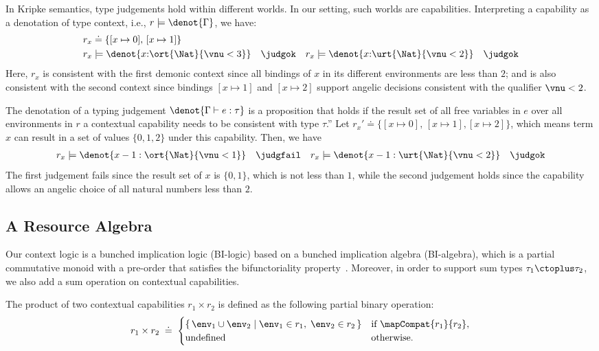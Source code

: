 \begin{example}\label{ex-algebraic-semantics} In Kripke semantics, type judgements hold within different
worlds.  In our setting, such worlds are capabilities.  Interpreting
a capability as a denotation of type context, i.e., $r \models
\denot{\Gamma}$, we have:
\begin{align*}
  &r_x \doteq \{[x \mapsto 0],\, [x \mapsto 1]\}
  \\& r_x \models \denot{x {:} \ort{\Nat}{\vnu < 3}} \quad \judgok \quad r_x \models \denot{x {:} \urt{\Nat}{\vnu < 2}}  \quad \judgok
\end{align*}\noindent
Here, $r_x$ is consistent with the first demonic context since all
bindings of $x$ in its different environments are less than $2$; and
is also consistent with the second context since bindings $[x\mapsto
  1]$ and $[x\mapsto 2]$ support angelic decisions consistent with the
qualifier $\vnu < 2$.

The denotation of a typing judgement $\denot{\Gamma \vdash e: \tau}$
is a proposition that holds if the result set of all free variables in
$e$ over all environments in $r$ a contextual capability needs to be
consistent with type $\tau$.'' Let $r_x' \doteq \{[x \mapsto 0],\, [x
  \mapsto 1], [x \mapsto 2]\}$, which means term $x$ can result in a
set of values $\{0, 1, 2\}$ under this capability. Then, we have
\begin{align*}
  r_x \models \denot{x - 1 : \ort{\Nat}{\vnu < 1}} \quad \judgfail \quad r_x \models \denot{x - 1 : \urt{\Nat}{\vnu < 2}}  \quad \judgok
\end{align*}\noindent
The first judgement fails since the result set of $x$ is $\{0, 1\}$,
which is not less than $1$, while the second judgement holds since the
capability allows an angelic choice of all natural numbers less than $2$.
\end{example}

\subsection{A Resource Algebra}

Our context logic is a bunched implication logic (BI-logic) based on a
bunched implication algebra (BI-algebra), which is a partial
commutative monoid with a pre-order that satisfies the bifunctoriality
property~\cite{...}. Moreover, in order to support sum types $\tau_1
\ctoplus \tau_2$, we also add a sum operation on contextual
capabilities.

\begin{definition}\label{def:contextual-capabilities-product}
  The product of two contextual capabilities $r_1 \times r_2$ is defined
  as the following  partial binary operation:
  \[
    r_1 \times r_2 \;\doteq\;
    \begin{cases}
      \{\, \env_1 \cup \env_2 \mid \env_1 \in r_1,\; \env_2 \in r_2 \,\}
        & \text{if } \mapCompat{r_1}{r_2}, \\
        \text{undefined}
        & \text{otherwise.}
      \end{cases}
  \]
\end{definition}

